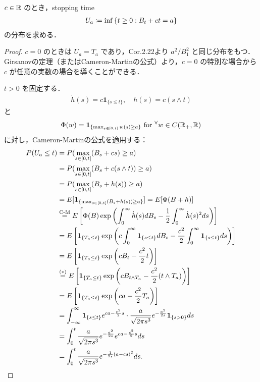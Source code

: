 \documentclass{jsarticle}
\begin{document}
$c\in\mathbb{R}$ のとき，stopping time
\begin{align}
    U_a\coloneqq\inf\left\{t\ge0:B_t+ct=a\right\}
\end{align}
の分布を求める．

\begin{proof}
    $c=0$ のときは $U_a=T_a$ であり，Cor.2.22より $a^2/B_1^2$ と同じ分布をもつ．
    Girsanovの定理（またはCameron-Martinの公式）より，$c=0$ の特別な場合から $c$ が任意の実数の場合を導くことができる．
    
    $t>0$ を固定する．
    \begin{align}
        \dot{h}(s)=c\bm{1}_{\{s\le t\}},\quad
        h(s)=c(s\wedge t)
    \end{align}
    と
    \begin{align}
        \Phi(w)=\bm{1}_{\{\max_{s\in[0,t]}w(s)\ge a\}}\text{ for }{}^{\forall} w\in C(\mathbb{R}_+,\mathbb{R})
    \end{align}
    に対し，Cameron-Martinの公式を適用する：
    \begin{align}
        P(U_a\le t)
        &= P(\max_{s\in[0,t]}(B_s+cs)\ge a) \\
        &= P(\max_{s\in[0,t]}(B_s+c(s\wedge t))\ge a) \\
        &= P(\max_{s\in[0,t]}(B_s+h(s))\ge a) \\
        &= E[\bm{1}_{\{\max_{s\in[0,t]}(B_s+h(s))\ge a\}}]
        = E[\Phi(B+h)] \\
        &\stackrel{\text{C-M}}{=} E\left[\Phi(B)\exp\left(\int_0^\infty \dot{h}(s)dB_s-\frac{1}{2}\int_0^\infty \dot{h}(s)^2 ds\right)\right] \\
        &= E\left[\bm{1}_{\{T_a\le t\}}\exp\left(c\int_0^\infty \bm{1}_{\{s\le t\}}dB_s-\frac{c^2}{2}\int_0^\infty \bm{1}_{\{s\le t\}} ds\right)\right] \\
        &= E\left[\bm{1}_{\{T_a\le t\}}\exp\left(cB_t-\frac{c^2}{2}t\right)\right] \\
        &\stackrel{(\ast)}{=} E\left[\bm{1}_{\{T_a\le t\}}\exp\left(cB_{t\wedge T_a}-\frac{c^2}{2}(t\wedge T_a)\right)\right] \\
        &= E\left[\bm{1}_{\{T_a\le t\}}\exp\left(ca-\frac{c^2}{2}T_a\right)\right] \\
        &= \int_{-\infty}^{\infty} \bm{1}_{\{s\le t\}}e^{ca-\frac{c^2}{2}s}\cdot\frac{a}{\sqrt{2\pi s^3}}e^{-\frac{a^2}{2s}}\bm{1}_{\{s>0\}}ds \\
        &= \int_0^t \frac{a}{\sqrt{2\pi s^3}}e^{-\frac{a^2}{2s}}e^{ca-\frac{c^2}{2}s}ds \\
        &= \int_0^t \frac{a}{\sqrt{2\pi s^3}}e^{-\frac{1}{2s}(a-cs)^2}ds.
    \end{align}
    

\end{proof}
\end{document}

